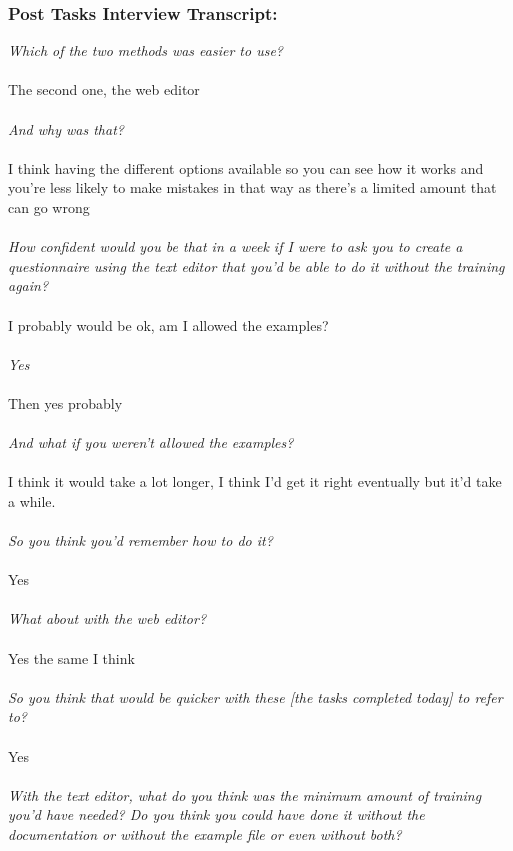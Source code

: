 \subsubsection*{Post Tasks Interview Transcript:}
\textit{Which of the two methods was easier to use?}
\\
\\
The second one, the web editor
\\
\\
\textit{And why was that?}
\\
\\
I think having the different options available so you can see how it works and you're less likely to make mistakes in that way as there's a limited amount that can go wrong
\\
\\
\textit{How confident would you be that in a week if I were to ask you to create a questionnaire using the text editor that you'd be able to do it without the training again?}
\\
\\
I probably would be ok, am I allowed the examples?
\\
\\
\textit{Yes}
\\
\\
Then yes probably
\\
\\
\textit{And what if you weren't allowed the examples?}
\\
\\
I think it would take a lot longer, I think I'd get it right eventually but it'd take a while.
\\
\\
\textit{So you think you'd remember how to do it?}
\\
\\
Yes
\\
\\
\textit{What about with the web editor?}
\\
\\
Yes the same I think
\\
\\
\textit{So you think that would be quicker with these [the tasks completed today] to refer to? }
\\
\\
Yes
\\
\\
\textit{With the text editor, what do you think was the minimum amount of training you'd have needed?  Do you think you could have done it without the documentation or without the example file or even without both?}
